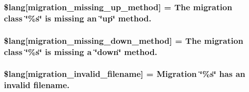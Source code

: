 \subsubsection[{\$lang}]{\setlength{\rightskip}{0pt plus 5cm}\$lang\mbox{[}\textquotesingle{}migration\+\_\+missing\+\_\+up\+\_\+method\textquotesingle{}\mbox{]} = \textquotesingle{}The migration class \char`\"{}\%s\char`\"{} is missing an \char`\"{}up\char`\"{} method.\textquotesingle{}}\label{system_2language_2english_2migration__lang_8php_a4bc9c60a4f078d1845d1d72370c363e8}
\hypertarget{system_2language_2english_2migration__lang_8php_a6e835ce0b327b8ea1df42bfc7a59f1cd}{}
\subsubsection[{\$lang}]{\setlength{\rightskip}{0pt plus 5cm}\$lang\mbox{[}\textquotesingle{}migration\+\_\+missing\+\_\+down\+\_\+method\textquotesingle{}\mbox{]} = \textquotesingle{}The migration class \char`\"{}\%s\char`\"{} is missing {\bf a} \char`\"{}down\char`\"{} method.\textquotesingle{}}\label{system_2language_2english_2migration__lang_8php_a6e835ce0b327b8ea1df42bfc7a59f1cd}
\hypertarget{system_2language_2english_2migration__lang_8php_a75ef7572f25674e4dd1e36a0d61080fa}{}
\subsubsection[{\$lang}]{\setlength{\rightskip}{0pt plus 5cm}\$lang\mbox{[}\textquotesingle{}migration\+\_\+invalid\+\_\+filename\textquotesingle{}\mbox{]} = \textquotesingle{}Migration \char`\"{}\%s\char`\"{} has an invalid filename.\textquotesingle{}}\label{system_2language_2english_2migration__lang_8php_a75ef7572f25674e4dd1e36a0d61080fa}
